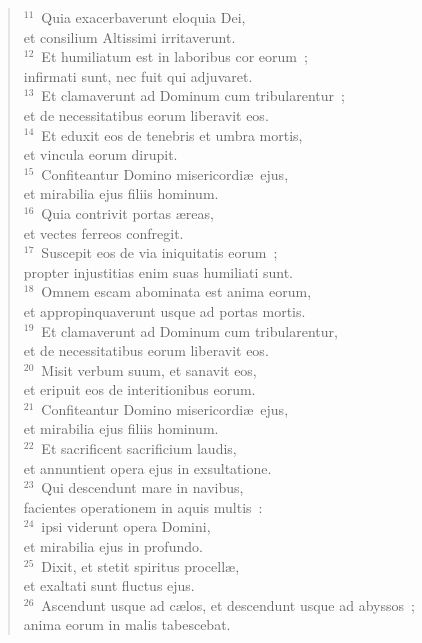 \begin{flushleft}
\begin{verse}
${}^{11}$~Quia exacerbaverunt eloquia Dei,\\ et consilium Altissimi irritaverunt.\\
${}^{12}$~Et humiliatum est in laboribus cor eorum~;\\ infirmati sunt, nec fuit qui adjuvaret.\\
${}^{13}$~Et clamaverunt ad Dominum cum tribularentur~;\\ et de necessitatibus eorum liberavit eos.\\
${}^{14}$~Et eduxit eos de tenebris et umbra mortis,\\ et vincula eorum dirupit.\\
${}^{15}$~Confiteantur Domino misericordi\ae\ ejus,\\ et mirabilia ejus filiis hominum.\\
${}^{16}$~Quia contrivit portas \ae reas,\\ et vectes ferreos confregit.\\
${}^{17}$~Suscepit eos de via iniquitatis eorum~;\\ propter injustitias enim suas humiliati sunt.\\
${}^{18}$~Omnem escam abominata est anima eorum,\\ et appropinquaverunt usque ad portas mortis.\\
${}^{19}$~Et clamaverunt ad Dominum cum tribularentur,\\ et de necessitatibus eorum liberavit eos.\\
${}^{20}$~Misit verbum suum, et sanavit eos,\\ et eripuit eos de interitionibus eorum.\\
${}^{21}$~Confiteantur Domino misericordi\ae\ ejus,\\ et mirabilia ejus filiis hominum.\\
${}^{22}$~Et sacrificent sacrificium laudis,\\ et annuntient opera ejus in exsultatione.\\
${}^{23}$~Qui descendunt mare in navibus,\\ facientes operationem in aquis multis~:\\
${}^{24}$~ipsi viderunt opera Domini,\\ et mirabilia ejus in profundo.\\
${}^{25}$~Dixit, et stetit spiritus procell\ae ,\\ et exaltati sunt fluctus ejus.\\
${}^{26}$~Ascendunt usque ad c\ae los, et descendunt usque ad abyssos~;\\ anima eorum in malis tabescebat.\\

\end{verse}
\end{flushleft}
